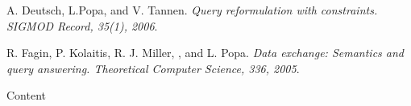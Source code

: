 \documentclass{vldb}
\begin{document}

  

\begin{thebibliography}{9}
A. Deutsch, L.Popa, and V. Tannen. 
\textit{
Query reformulation with constraints. SIGMOD Record, 35(1), 2006}. 

R. Fagin, P. Kolaitis, R. J. Miller, , and L. Popa.
\textit{
Data exchange: Semantics and query answering. Theoretical Computer Science, 336, 2005}.
 
\end{thebibliography}


\begin{appendix}
Content 

\end{appendix}
\end{document}
